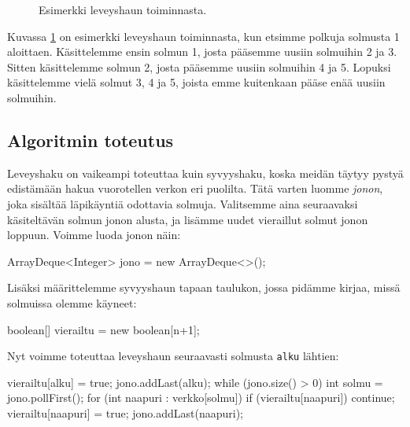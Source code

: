 \begin{figure}
\begin{center}
\end{center}
\caption{Esimerkki leveyshaun toiminnasta.}
\label{fig:levhak}
\end{figure}

Kuvassa \ref{fig:levhak} on esimerkki leveyshaun toiminnasta,
kun etsimme polkuja solmusta 1 aloittaen.
Käsittelemme ensin solmun 1, josta pääsemme uusiin solmuihin 2 ja 3.
Sitten käsittelemme solmun 2, josta pääsemme uusiin solmuihin 4 ja 5.
Lopuksi käsittelemme vielä solmut 3, 4 ja 5,
joista emme kuitenkaan pääse enää uusiin solmuihin.

\subsection{Algoritmin toteutus}

Leveyshaku on vaikeampi toteuttaa kuin syvyyshaku,
koska meidän täytyy pystyä edistämään hakua vuorotellen verkon eri puolilta.
Tätä varten luomme \emph{jonon}, joka sisältää läpikäyntiä odottavia solmuja.
Valitsemme aina seuraavaksi käsiteltävän solmun jonon alusta,
ja lisämme uudet vieraillut solmut jonon loppuun.
Voimme luoda jonon näin:

\begin{code}
ArrayDeque<Integer> jono = new ArrayDeque<>();
\end{code}

Lisäksi määrittelemme syvyyshaun tapaan taulukon, jossa pidämme kirjaa,
missä solmuissa olemme käyneet:

\begin{code}
boolean[] vierailtu = new boolean[n+1];
\end{code}

Nyt voimme toteuttaa leveyshaun seuraavasti solmusta \texttt{alku} lähtien:

\begin{code}
vierailtu[alku] = true;
jono.addLast(alku);
while (jono.size() > 0) {
    int solmu = jono.pollFirst();
    for (int naapuri : verkko[solmu]) {
        if (vierailtu[naapuri]) continue;
        vierailtu[naapuri] = true;
        jono.addLast(naapuri);
    }
}
\end{code}

